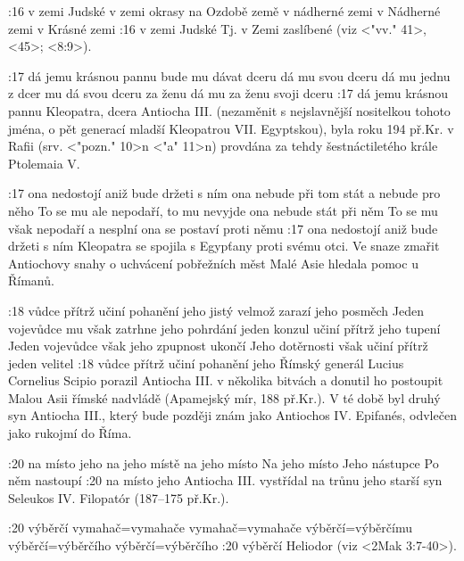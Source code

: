 :16  
    {v zemi Judské}   %
    {v zemi okrasy}   %
    {na Ozdobě země}   %
    {v nádherné zemi}   %
    {v Nádherné zemi}   %
    {v Krásné zemi}   %
:16 {v zemi Judské}
    Tj. v Zemi zaslíbené (viz <"vv." 41>, <45>; <8:9>).

:17  
    {dá jemu krásnou pannu}  %
    {bude mu dávat dceru}   %
    {dá mu svou dceru}  %
    {dá mu jednu z dcer}  %
    {mu dá svou dceru za ženu}   %
    {dá mu za ženu svoji dceru}   %
:17 {dá jemu krásnou pannu}
    Kleopatra, dcera Antiocha III. (nezaměnit s nejslavnější nositelkou tohoto jména, o pět generací mladší Kleopatrou VII. Egyptskou), byla roku 194 př.Kr. v Rafii (srv. <"pozn." 10>n <"a" 11>n) provdána za tehdy šestnáctiletého krále Ptolemaia V. 
    
:17  
    {ona nedostojí aniž bude držeti s ním}   %
    {ona nebude při tom stát a nebude pro něho}   %
    {To se mu ale nepodaří, to mu nevyjde}   %
    {ona nebude stát při něm}   %
    {To se mu však nepodaří a nesplní}   %
    {ona se postaví proti němu}   %
:17 {ona nedostojí aniž bude držeti s ním}
   Kleopatra se spojila s Egypťany proti svému otci. Ve snaze zmařit Antiochovy snahy o uchvácení pobřežních měst Malé Asie hledala pomoc u Římanů.  

:18  
    {vůdce přítrž učiní pohanění jeho}   %
    {jistý velmož zarazí jeho posměch}   %
    {Jeden vojevůdce mu však zatrhne jeho pohrdání}   %
    {jeden konzul učiní přítrž jeho tupení}   %
    {Jeden vojevůdce však jeho zpupnost ukončí}   %
    {Jeho dotěrnosti však učiní přítrž jeden velitel}   %
:18 {vůdce přítrž učiní pohanění jeho}  
    Římský generál Lucius Cornelius Scipio porazil Antiocha III. v několika bitvách a donutil ho postoupit Malou Asii římské nadvládě (Apamejský mír, 188 př.Kr.). V té době byl druhý syn Antiocha III., který bude později  znám jako Antiochos IV. Epifanés, odvlečen jako rukojmí do Říma.

:20
    {na místo jeho}  %
    {na jeho místě}   %
    {na jeho místo}   %
    {Na jeho místo}   %
    {Jeho nástupce}   %
    {Po něm nastoupí}   %
:20 {na místo jeho}
    Antiocha III. vystřídal na trůnu jeho starší syn Seleukos IV. Filopatór (187--175 př.Kr.).

:20
    {výběrčí}  %
    {vymahač}={vymahače}   %
    {vymahač}={vymahače}   %
    {výběrčí}={výběrčímu}   %
    {výběrčí}={výběrčího}   %
    {výběrčí}={výběrčího}   %
:20 {výběrčí}
    Heliodor (viz <2Mak 3:7-40>).
    
